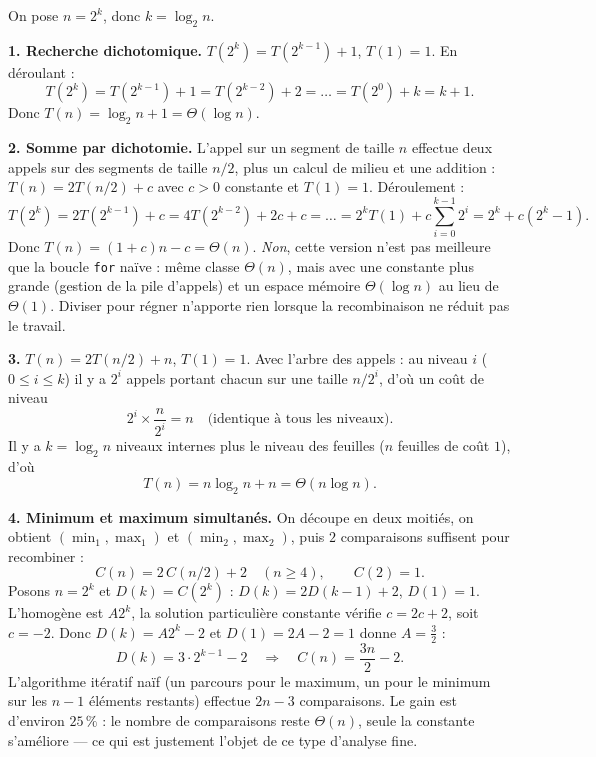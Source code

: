 \documentclass[11pt,a4paper]{article}
\begin{document}

\reponse
On pose $n=2^{k}$, donc $k=\log_2 n$.

\textbf{1. Recherche dichotomique.} $T(2^{k}) = T(2^{k-1})+1$, $T(1)=1$. En déroulant :
\[
  T(2^{k}) = T(2^{k-1})+1 = T(2^{k-2})+2 = \dots = T(2^{0}) + k = k+1 .
\]
Donc $T(n)=\log_2 n + 1 = \Theta(\log n)$.

\textbf{2. Somme par dichotomie.} L'appel sur un segment de taille $n$ effectue deux
appels sur des segments de taille $n/2$, plus un calcul de milieu et une addition :
$T(n)=2T(n/2)+c$ avec $c>0$ constante et $T(1)=1$. Déroulement :
\[
  T(2^{k}) = 2T(2^{k-1})+c = 4T(2^{k-2})+2c+c = \dots
  = 2^{k}T(1) + c\sum_{i=0}^{k-1}2^{i} = 2^{k} + c(2^{k}-1).
\]
Donc $T(n) = (1+c)n - c = \Theta(n)$.
\emph{Non}, cette version n'est pas meilleure que la boucle \texttt{for} naïve : même
classe $\Theta(n)$, mais avec une constante plus grande (gestion de la pile d'appels) et
un espace mémoire $\Theta(\log n)$ au lieu de $\Theta(1)$. Diviser pour régner n'apporte
rien lorsque la recombinaison ne réduit pas le travail.

\textbf{3.} $T(n)=2T(n/2)+n$, $T(1)=1$. Avec l'arbre des appels : au niveau $i$
($0\le i\le k$) il y a $2^{i}$ appels portant chacun sur une taille $n/2^{i}$, d'où un
coût de niveau
\[
  2^{i}\times \frac{n}{2^{i}} = n \quad\text{(identique à tous les niveaux)} .
\]
Il y a $k=\log_2 n$ niveaux internes plus le niveau des feuilles ($n$ feuilles de coût
$1$), d'où
\[
  T(n) = n\log_2 n + n = \Theta(n\log n).
\]

\textbf{4. Minimum et maximum simultanés.} On découpe en deux moitiés, on obtient
$(\min_1,\max_1)$ et $(\min_2,\max_2)$, puis $2$ comparaisons suffisent pour recombiner :
\[
  C(n)=2\,C(n/2)+2 \quad (n\ge4),\qquad C(2)=1 .
\]
Posons $n=2^{k}$ et $D(k)=C(2^{k})$ : $D(k)=2D(k-1)+2$, $D(1)=1$.
L'homogène est $A2^{k}$, la solution particulière constante vérifie $c=2c+2$, soit
$c=-2$. Donc $D(k)=A2^{k}-2$ et $D(1)=2A-2=1$ donne $A=\tfrac32$ :
\[
  D(k)= 3\cdot 2^{k-1}-2 \quad\Longrightarrow\quad \boxed{C(n)=\frac{3n}{2}-2}.
\]
L'algorithme itératif naïf (un parcours pour le maximum, un pour le minimum sur les
$n-1$ éléments restants) effectue $2n-3$ comparaisons. Le gain est d'environ $25\,\%$ :
le nombre de comparaisons reste $\Theta(n)$, seule la constante s'améliore --- ce qui est
justement l'objet de ce type d'analyse fine.
\end{document}

